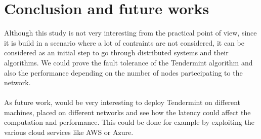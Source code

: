 \documentclass{article}
\begin{document}
	\section{Conclusion and future works}
	Although this study is not very interesting from the practical point of view, since it is build in a scenario where a lot of contraints are not considered, it can be considered as an initial step to go through distributed systems and their algorithms. We could prove the fault tolerance of the Tendermint algorithm and also the performance depending on the number of nodes partecipating to the network. \\ \\
	As future work, would be very interesting to deploy Tendermint on different machines, placed on different networks and see how the latency could affect the computation and performance. This could be done for example by exploiting the various cloud services like AWS or Azure.
\end{document}
